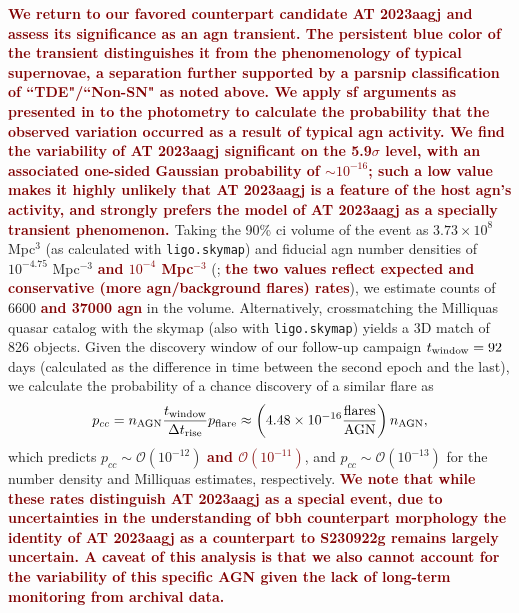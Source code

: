 \documentclass[twocolumn]{aastex631}
\newcommand{\response}[1]{\textbf{\textcolor{maroon}{#1}}}
\begin{document}
\response{
We return to our favored counterpart candidate AT 2023aagj and assess its significance as an \gls{agn} transient.
The persistent blue color of the transient distinguishes it from the phenomenology of typical supernovae, a separation further supported by a \gls{parsnip} classification of ``TDE"/``Non-SN" as noted above.
We apply \gls{sf} arguments as presented in \citep{palmeseLIGOVirgoBlack2021} to the photometry to calculate the probability that the observed variation occurred as a result of typical \gls{agn} activity.
We find the variability of AT 2023aagj significant on the 5.9$\sigma$ level, with an associated one-sided Gaussian probability of $\sim 10^{-16}$; such a low value makes it highly unlikely that AT 2023aagj is a feature of the host \gls{agn}'s activity, and strongly prefers the model of AT 2023aagj as a specially transient phenomenon.
}
Taking the 90\% \gls{ci} volume of the event as $3.73 \times 10^8$ Mpc$^3$ (as calculated with \texttt{ligo.skymap}) and fiducial \gls{agn} number densities of $10^{-4.75}$ Mpc$^{-3}$ \response{and $10^{-4}$ Mpc$^{-3}$} (\citealt{bartosGravitationalwaveLocalizationAlone2017a,Greene:2007xw}; \response{the two values reflect expected and conservative (more \gls{agn}/background flares) rates}), we estimate counts of 6600 \response{and 37000 \gls{agn}} in the volume.
Alternatively, crossmatching the Milliquas \citep{fleschMillionQuasarsMilliquas2023} quasar catalog with the skymap (also with \texttt{ligo.skymap}) yields a 3D match of 826 objects.
Given the discovery window of our follow-up campaign $t_{\rm window} = 92$ days (calculated as the difference in time between the second epoch and the last), we calculate the probability of a chance discovery of a similar flare as
\begin{equation}
    p_{cc}
    = n_{\rm AGN} \frac{t_{\rm window}}{\Delta t_{\rm rise}} p_{\rm flare}
    \approx \left( 4.48 \times 10^{-16} \frac{\text{flares}}{\text{AGN}} \right) n_{\rm AGN},
\end{equation}
which predicts $p_{cc} \sim \mathcal{O}(10^{-12})$ \response{and $\mathcal{O}(10^{-11})$}, and $p_{cc} \sim \mathcal{O}(10^{-13})$ for the number density and Milliquas estimates, respectively.
\response{
We note that while these rates distinguish AT 2023aagj as a special event, due to uncertainties in the understanding of \gls{bbh} counterpart morphology the identity of AT 2023aagj as a counterpart to S230922g remains largely uncertain. A caveat of this analysis is that we also cannot account for the variability of this specific AGN given the lack of long-term monitoring from archival data.}
\end{document}
